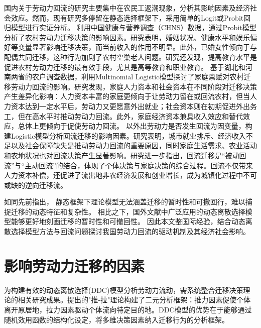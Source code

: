 \documentclass[master, final]{zufe-thesis}
\begin{document}
国内关于劳动力回流的研究主要集中在农民工返潮现象，分析其影响因素及经济社会效应。然而，现有研究多停留在静态选择框架下，采用简单的Logit或Probit回归模型进行实证分析。
\textcite{WangZhiQiangZhongGuoNongCunLaoDongLiQianYiYingXiangYinSuYanJiuJiYuProbitMoXingDeShiZhengFenXi2011}利用中国健康与营养调查（CHNS）数据，通过Probit模型分析了农村劳动力迁移决策的影响因素。研究表明，婚姻状况、健康水平和娱乐偏好等变量显著影响迁移决策，而当前收入的作用不明显。此外，已婚女性倾向于与配偶共同迁移，这种行为加剧了农村空巢老人问题。研究还发现，提高教育水平是促进农村劳动力迁移的最有效手段，尤其是高等教育和职业教育。
\textcite{ShiZhiLeiJiaTingBingFuJiaTingJueCeYuNongCunQianYiLaoDongLiHuiLiu2012}基于湖北和河南两省的农户调查数据，利用Multinomial Logistic模型探讨了家庭禀赋对农村迁移劳动力回流的影响。研究发现，家庭人力资本和社会资本在不同阶段对迁移决策产生差异化影响：人力资本丰富的家庭更倾向于让劳动力留在或回流农村，但当人力资本达到一定水平后，劳动力又更愿意外出就业；社会资本则在初期促进外出务工，但在高水平时推动劳动力回流。此外，家庭经济资本兼具收入效应和替代效应，总体上更倾向于促使劳动力回流。
\textcite{RenYuanNongCunWaiChuLaoDongLiHuiLiuQianYiDeYingXiangYinSuHeHuiLiuXiaoYing2017}以外出劳动力是否发生回流为因变量，构建Logistic模型分析回流迁移的影响因素。研究表明，城市就业排斥、经济收入不足以及社会保障缺失是推动劳动力回流的重要原因，同时家庭生活需求、农业活动和农地状况也对回流决策产生显著影响。研究进一步指出，回流迁移是“被动回流”与“主动回流”的结合，体现了个体决策与家庭决策的综合过程。回流不仅带来人力资本补偿，还促进了流出地非农经济发展和创业增长，成为城镇化过程中不可或缺的逆向迁移流。


如同先前指出，
静态框架下理论模型无法涵盖迁移的暂时性和可撤回行，难以捕捉迁移的动态特征和复杂性。
相比之下，国外文献中广泛应用的动态离散选择模型能够更好地刻画迁移的暂时性和可撤回性。
因此本文鉴国际经验，结合动态离散选择模型方法与回流问题探讨我国劳动力回流的驱动机制及其经济社会影响。


\section{影响劳动力迁移的因素}
\label{sec:_影响劳动力迁移的因素}

为构建有效的动态离散选择(DDC)模型分析劳动力流动，需系统整合迁移决策理论的相关研究成果。\textcite{leeTheoryMigration1966}提出的"推-拉"理论构建了二元分析框架：推力因素促使个体离开原居地，拉力因素驱动个体流向特定目的地。DDC模型的优势在于能够通过随机效用函数的结构化设定，将多维决策因素纳入迁移行为的分析框架。
\end{document}
